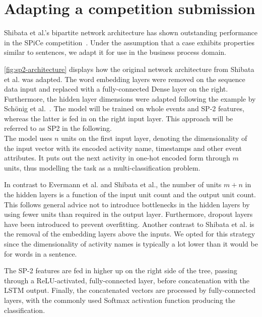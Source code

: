 \section{Adapting a competition submission}
\label{sec:contrib:sp2-inspiration}
Shibata et al.'s bipartite network architecture has shown outstanding performance in the SPiCe competition~\cite{web:spice}. Under the assumption that a case exhibits properties similar to sentences, we adapt it for use in the business process domain.

\autoref{fig:sp2-architecture} displays how the original network architecture from Shibata et al. was adapted. The word embedding layers were removed on the sequence data input and replaced with a fully-connected Dense layer on the right. Furthermore, the hidden layer dimensions were adapted following the example by Schönig et al.~\cite{schoenig2018}. The model will be trained on whole events and SP-2 features, whereas the latter is fed in on the right input layer. This approach will be referred to as SP2 in the following.\\

The model uses $n$ units on the first input layer, denoting the dimensionality of the input vector with its encoded activity name, timestamps and other event attributes. It puts out the next activity in one-hot encoded form through $m$ units, thus modelling the task as a multi-classification problem.

In contrast to Evermann et al. and Shibata et al., the number of units $m+n$ in the hidden layers is a function of the input unit count and the output unit count. This follows general advice not to introduce bottlenecks in the hidden layers by using fewer units than required in the output layer. Furthermore, dropout layers have been introduced to prevent overfitting. Another contrast to Shibata et al. is the removal of the embedding layers above the inputs. We opted for this strategy since the dimensionality of activity names is typically a lot lower than it would be for words in a sentence.

The SP-2 features are fed in higher up on the right side of the tree, passing through a ReLU-activated, fully-connected layer, before concatenation with the LSTM output. Finally, the concatenated vectors are processed by fully-connected layers, with the commonly used Softmax activation function producing the classification.

